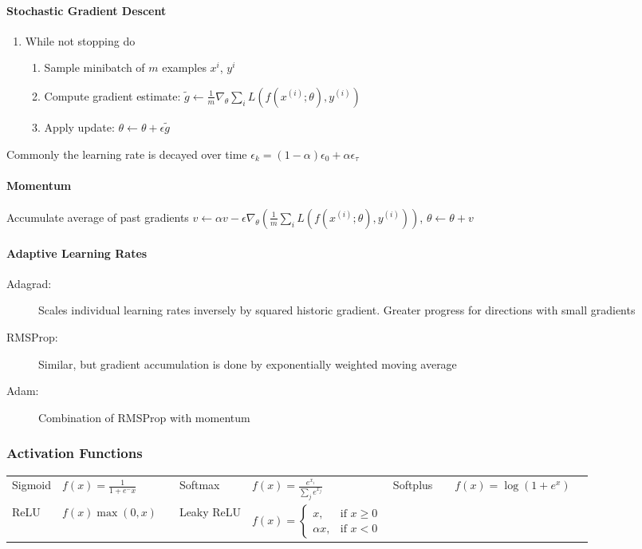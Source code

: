 \paragraph{Stochastic Gradient Descent}
\begin{enumerate}
    \item While not stopping do
          \begin{enumerate}
              \item Sample minibatch of $m$ examples $x^i$, $y^i$
              \item Compute gradient estimate: $\tilde{g}\leftarrow \frac{1}{m}\nabla_\theta \sum_i L(f(x^{(i)};\theta),y^{(i)})$
              \item Apply update: $\theta \leftarrow \theta + \epsilon \tilde{g}$
          \end{enumerate}
\end{enumerate}
Commonly the learning rate is decayed over time $\epsilon_k = (1-\alpha)\epsilon_0 + \alpha \epsilon_\tau$

\paragraph{Momentum}
Accumulate average of past gradients
$v \leftarrow \alpha v - \epsilon \nabla_\theta \left(\frac{1}{m}\sum_i L(f(x^{(i)};\theta),y^{(i)})\right)$, $\theta \leftarrow \theta + v$

\paragraph{Adaptive Learning Rates}
\begin{description}
    \item[Adagrad:] Scales individual learning rates inversely by squared historic gradient. Greater progress for directions with small gradients
    \item[RMSProp:] Similar, but gradient accumulation is done by exponentially weighted moving average
    \item[Adam:] Combination of RMSProp with momentum
\end{description}

\subsubsection{Activation Functions}
\begin{tabular}{l l m{1cm} l l m{1cm} l l}
    Sigmoid & $f(x)=\frac{1}{1+e^-x}$ &  & Softmax    & $f(x)=\frac{e^{x_i}}{\sum_j e^{x_j}}$            & Softplus & $\quad f(x)=\log(1+e^x)$ \\
    ReLU    & $f(x)\max(0,x)$         &  & Leaky ReLU & $f(x)=\left\{\begin{matrix} x, & \text{if } x\geq 0 \\ \alpha x, & \text{if } x<0 \end{matrix} \right.$
\end{tabular}

